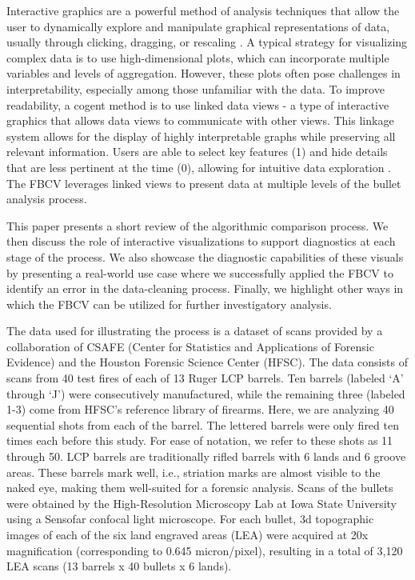 \documentclass[
  12pt]{article}
\begin{document}
Interactive graphics are a powerful method of analysis techniques that
allow the user to dynamically explore and manipulate graphical
representations of data, usually through clicking, dragging, or
rescaling
\citep{eickHighInteractionGraphics1995, swayneIntroductionSpecialIssue1999, urbanekIPlotsEXtremeNextgeneration2011}.
A typical strategy for visualizing complex data is to use
high-dimensional plots, which can incorporate multiple variables and
levels of aggregation. However, these plots often pose challenges in
interpretability, especially among those unfamiliar with the
data\citep{willsLinkedDataViews2008}. To improve readability, a cogent
method is to use linked data views - a type of interactive graphics that
allows data views to communicate with other views. This linkage system
allows for the display of highly interpretable graphs while preserving
all relevant information. Users are able to select key features (1) and
hide details that are less pertinent at the time (0), allowing for
intuitive data exploration \citep{willsLinkedDataViews2008}. The FBCV
leverages linked views to present data at multiple levels of the bullet
analysis process.

This paper presents a short review of the algorithmic comparison
process. We then discuss the role of interactive visualizations to
support diagnostics at each stage of the process. We also showcase the
diagnostic capabilities of these visuals by presenting a real-world use
case where we successfully applied the FBCV to identify an error in the
data-cleaning process. Finally, we highlight other ways in which the
FBCV can be utilized for further investigatory analysis.

The data used for illustrating the process is a dataset of scans
provided by a collaboration of CSAFE (Center for Statistics and
Applications of Forensic Evidence) and the Houston Forensic Science
Center (HFSC). The data consists of scans from 40 test fires of each of
13 Ruger LCP barrels. Ten barrels (labeled `A' through `J') were
consecutively manufactured, while the remaining three (labeled 1-3) come
from HFSC's reference library of firearms. Here, we are analyzing 40
sequential shots from each of the barrel. The lettered barrels were only
fired ten times each before this study. For ease of notation, we refer
to these shots as 11 through 50. LCP barrels are traditionally rifled
barrels with 6 lands and 6 groove areas. These barrels mark well, i.e.,
striation marks are almost visible to the naked eye, making them
well-suited for a forensic analysis. Scans of the bullets were obtained
by the High-Resolution Microscopy Lab at Iowa State University using a
Sensofar confocal light microscope. For each bullet, 3d topographic
images of each of the six land engraved areas (LEA) were acquired at 20x
magnification (corresponding to 0.645 micron/pixel), resulting in a
total of 3,120 LEA scans (13 barrels x 40 bullets x 6 lands).
\end{document}
